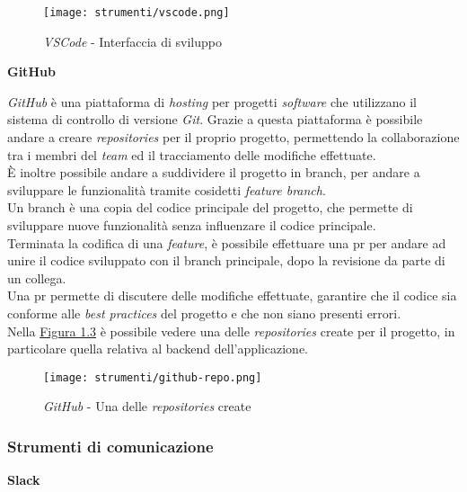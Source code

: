 \begin{figure}[H]
    \label{fig:vscode}
    \centering
    \texttt{[image: strumenti/vscode.png]}
    \caption{\textit{VSCode} - Interfaccia di sviluppo}
\end{figure}

\noindent \textbf{GitHub\\}

\noindent \textit{GitHub} è una piattaforma di \textit{hosting} per progetti \textit{software} che utilizzano il sistema di controllo di versione \textit{Git}.
Grazie a questa piattaforma è possibile andare a creare \textit{repositories} per il proprio progetto, permettendo la collaborazione tra i membri del \textit{team} ed il tracciamento delle modifiche effettuate. \\
È inoltre possibile andare a suddividere il progetto in \gls{branch}, per andare a sviluppare le funzionalità tramite cosidetti \textit{feature branch}.\\
Un \gls{branch} è una copia del codice principale del progetto, che permette di sviluppare nuove funzionalità senza influenzare il codice principale.\\
Terminata la codifica di una \textit{feature}, è possibile effettuare una \gls{pr} per andare ad unire il codice sviluppato con il \gls{branch} principale, dopo la revisione da parte di un collega.\\
Una \gls{pr} permette di discutere delle modifiche effettuate, garantire che il codice sia conforme alle \textit{best practices} del progetto e che non siano presenti errori.\\
Nella {\hyperref[fig:github]{Figura 1.3}} è possibile vedere una delle \textit{repositories} create per il progetto, in particolare quella relativa al \gls{backend} dell'applicazione.

\begin{figure}[H]
    \label{fig:github} 
    \centering
    \texttt{[image: strumenti/github-repo.png]}
    \caption{\textit{GitHub} - Una delle \textit{repositories} create}
\end{figure}

\pagebreak
\subsubsection{Strumenti di comunicazione}
\label{sez:strumenti-comunicazione}


\noindent \textbf{Slack\\}

